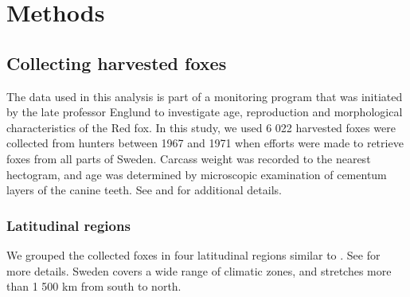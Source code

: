 \documentclass[PCJ,Unicode,screen]{cedram}
\begin{document}

\section*{Methods}

\subsection*{Collecting harvested foxes}

The data used in this analysis is part of a monitoring program that was initiated by the late professor Englund to investigate age, reproduction and morphological characteristics of the Red fox. In this study, we used 6 022 harvested foxes were collected from hunters between 1967 and 1971 when efforts were made to retrieve foxes from all parts of Sweden. Carcass weight was recorded to the nearest hectogram, and age was determined by microscopic examination of cementum layers of the canine teeth.  See \citep{englund1965studies} and \cite{englund1970some} for additional details. 

\subsubsection*{Latitudinal regions}



We grouped the collected foxes in four latitudinal regions similar to \cite{englund1970some}.  See \citep{zhengEstimatingNetPrimary2004, GeographySweden2025,MarkanvandningenSverigeLand2013} for more details. Sweden covers a wide range of climatic zones, and stretches more than 1 500 km from south to north.  

\end{document}
